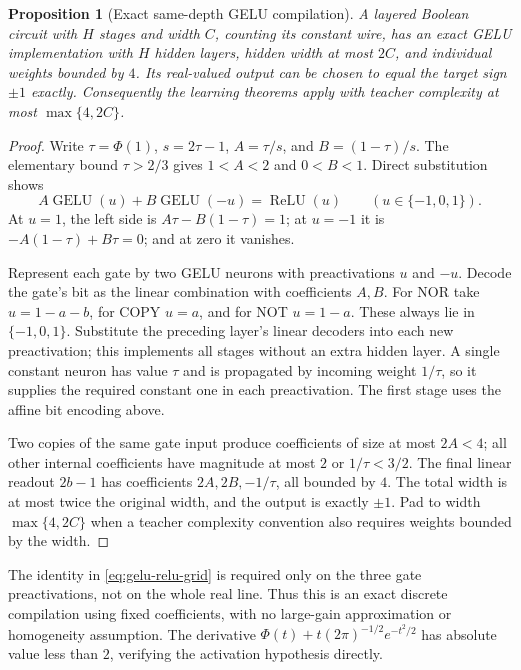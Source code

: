 \documentclass[11pt]{article}
\newtheorem{proposition}[theorem]{Proposition}
\theoremstyle{remark}\newtheorem{remark}[theorem]{Remark}
\newcommand{\relu}{\operatorname{ReLU}}\newcommand{\gelu}{\operatorname{GELU}}
\begin{document}
\begin{proposition}[Exact same-depth GELU compilation]\label{prop:gelu-circuit}
A layered Boolean circuit with $H$ stages and width $C$, counting its constant wire, has an exact GELU implementation with $H$ hidden layers, hidden width at most $2C$, and individual weights bounded by $4$. Its real-valued output can be chosen to equal the target sign $\pm1$ exactly. Consequently the learning theorems apply with teacher complexity at most $\max\{4,2C\}$.
\end{proposition}
\begin{proof}
Write $\tau=\Phi(1)$, $s=2\tau-1$, $A=\tau/s$, and $B=(1-\tau)/s$. The elementary bound $\tau>2/3$ gives $1<A<2$ and $0<B<1$. Direct substitution shows
\begin{equation}\label{eq:gelu-relu-grid}
 A\gelu(u)+B\gelu(-u)=\relu(u)\qquad(u\in\{-1,0,1\}).
\end{equation}
At $u=1$, the left side is $A\tau-B(1-\tau)=1$; at $u=-1$ it is $-A(1-\tau)+B\tau=0$; and at zero it vanishes.

Represent each gate by two GELU neurons with preactivations $u$ and $-u$. Decode the gate's bit as the linear combination with coefficients $A,B$. For NOR take $u=1-a-b$, for COPY $u=a$, and for NOT $u=1-a$. These always lie in $\{-1,0,1\}$. Substitute the preceding layer's linear decoders into each new preactivation; this implements all stages without an extra hidden layer. A single constant neuron has value $\tau$ and is propagated by incoming weight $1/\tau$, so it supplies the required constant one in each preactivation. The first stage uses the affine bit encoding above.

Two copies of the same gate input produce coefficients of size at most $2A<4$; all other internal coefficients have magnitude at most $2$ or $1/\tau<3/2$. The final linear readout $2b-1$ has coefficients $2A,2B,-1/\tau$, all bounded by $4$. The total width is at most twice the original width, and the output is exactly $\pm1$. Pad to width $\max\{4,2C\}$ when a teacher complexity convention also requires weights bounded by the width.
\end{proof}

The identity in \eqref{eq:gelu-relu-grid} is required only on the three gate preactivations, not on the whole real line. Thus this is an exact discrete compilation using fixed coefficients, with no large-gain approximation or homogeneity assumption. The derivative $\Phi(t)+t(2\pi)^{-1/2}e^{-t^2/2}$ has absolute value less than $2$, verifying the activation hypothesis directly.
\end{document}
